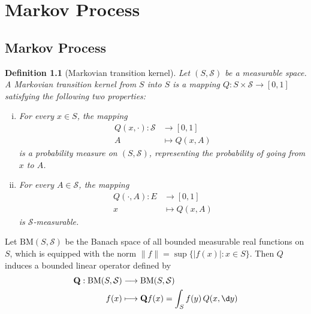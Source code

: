 \documentclass{report}
\newtheorem{definition}{Definition}[section]
\theoremstyle{nonumberplain}
\begin{document}
\chapter{Markov Process}
\section{Markov Process}
\begin{definition}[Markovian transition kernel]
Let $(S, \mathcal{S})$ be a measurable space. A \emph{Markovian transition kernel} from $S$ into $S$ is a mapping $Q: S \times \mathcal{S} \longrightarrow[0,1]$ satisfying the following two properties:
\begin{enumerate}[(i)]
	\item For every $x \in S$, the mapping
	\begin{align*}
		Q(x, \cdot):\mathcal{S}&\longrightarrow [0,1]\\
		 A &\longmapsto Q(x, A)
	\end{align*}
	is a probability measure on $(S, \mathcal{S})$, representing the probability of going from $x$ to $A$.
	\item For every $A \in \mathcal{S}$, the mapping
	\begin{align*}
		Q(\cdot, A):E&\longrightarrow [0,1]\\
		x &\longmapsto Q(x, A)
	\end{align*}
	is $\mathcal{S}$-measurable.
\end{enumerate}
\end{definition}	

Let $\mathrm{BM}(S,\mathcal{S})$ be the Banach space of all bounded measurable real functions on $S$, which is equipped with the norm $\|f\|=\sup \{|f(x)|: x \in S\}$. Then $Q$ induces a bounded linear operator defined by
\begin{align*}
	\mathbf{Q}:\mathrm{BM}(S,\mathcal{S}) &\longrightarrow\mathrm{BM}(S,\mathcal{S}) \\
	f(x) &\longmapsto \mathbf{Q}f(x)=\int_S f(y)\,Q(x,\d y)
\end{align*}
\end{document}
